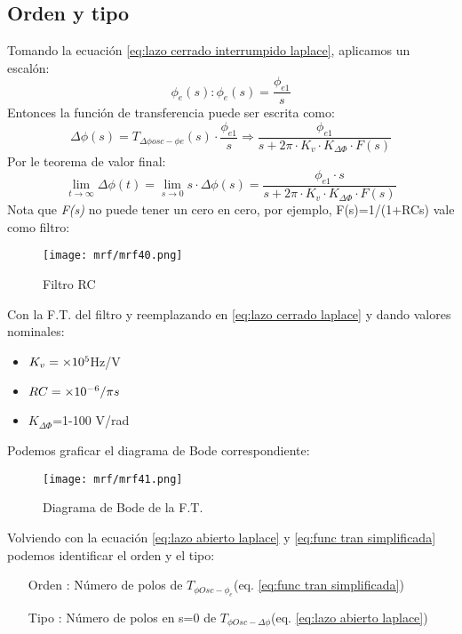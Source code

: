 \documentclass[
	12pt, %
	fleqn, %
	a4paper, %
	oneside, %
]{LegrandOrangeBook}
\begin{document}
\subsection{Orden y tipo}
Tomando la ecuación \ref{eq:lazo cerrado interrumpido laplace}, aplicamos un escalón:
\begin{displaymath}
\phi_e(s): \phi_e(s)=\frac{\phi_{e1}}{s}
\end{displaymath}
Entonces la función de transferencia puede ser escrita como:
\begin{displaymath}
\Delta\phi(s)=T_{\Delta\phi osc-\phi e}(s)\cdot\frac{\phi_{e1}}{s}\Rightarrow\frac{\phi_{e1}}{s+2\pi\cdot K_v\cdot K_{\Delta\Phi}\cdot F(s)}
\end{displaymath}
Por le teorema de valor final:
\begin{displaymath}
\lim_{t\to\infty}\Delta\phi(t)=\lim_{s\to 0}s\cdot\Delta\phi(s)=\frac{\phi_{e1}\cdot s}{s+2\pi\cdot K_v\cdot K_{\Delta\Phi}\cdot F(s)}
\end{displaymath}
Nota que \textit{F(s)} no puede tener un cero en cero, por ejemplo, F(s)=1/(1+RCs) vale como filtro:
\begin{figure}[H]
\centering
\texttt{[image: mrf/mrf40.png]}
\caption{Filtro RC}
\end{figure}
Con la F.T. del filtro y reemplazando en \ref{eq:lazo cerrado laplace} y dando valores nominales:
\begin{itemize}
\item $K_v=\times 10^{5}$Hz/V
\item $RC=\times 10^{-6}/\pi s$
\item $K_{\Delta\Phi}$=1-100 V/rad
\end{itemize}
Podemos graficar el diagrama de Bode correspondiente:
\begin{figure}[H]
\centering
\texttt{[image: mrf/mrf41.png]}
\caption{Diagrama de Bode de la F.T.}
\end{figure}
Volviendo con la ecuación \ref{eq:lazo abierto laplace} y \ref{eq:func tran simplificada} podemos identificar el orden y el tipo:
\begin{enumerate}
\item[Orden]: Número de polos de $T_{\phi Osc-\phi_e}$(eq. \ref{eq:func tran simplificada})
\item[Tipo]: Número de polos en s=0 de $T_{\phi Osc-\Delta\phi}$(eq. \ref{eq:lazo abierto laplace})
\end{enumerate}
\end{document}
